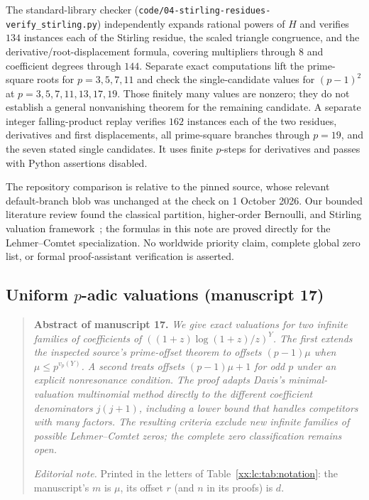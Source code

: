 \documentclass[11pt,a4paper]{article}
\numberwithin{equation}{section}
\theoremstyle{definition}
\theoremstyle{remark}
\theoremstyle{plain}
\begin{document}
The standard-library checker
(\texttt{code/04-stirling-\allowbreak residues-\allowbreak verify\_stirling.py})
independently expands rational powers of $H$ and verifies $134$ instances each
of the Stirling residue, the scaled triangle congruence, and the
derivative/root-displacement formula, covering multipliers through $8$ and
coefficient degrees through $144$. Separate exact computations lift the
prime-square roots for $p=3,5,7,11$ and check the single-candidate values for
$(p-1)^2$ at $p=3,5,7,11,13,17,19$. Those finitely many values are nonzero; they
do not establish a general nonvanishing theorem for the remaining candidate. A
separate integer falling-product replay verifies $162$ instances each of the two
residues, derivatives and first displacements, all prime-square branches through
$p=19$, and the seven stated single candidates. It uses finite $p$-steps for
derivatives and passes with Python assertions disabled.

The repository comparison is relative to the pinned source, whose relevant
default-branch blob was unchanged at the check on 1 October 2026. Our bounded
literature review found the classical partition, higher-order Bernoulli, and
Stirling valuation framework~\cite{xx-davis,xx-adelberg}; the formulas in this
note are proved directly for the Lehmer--Comtet specialization. No worldwide
priority claim, complete global zero list, or formal proof-assistant
verification is asserted.

\subsection{Uniform \texorpdfstring{$p$}{p}-adic valuations (manuscript 17)}\label{xx:pn:sec}

\begin{quote}\small
\textbf{Abstract of manuscript 17.}\itshape
We give exact valuations for two infinite families of coefficients of
$((1+z)\log(1+z)/z)^Y$. The first extends the inspected source's prime-offset
theorem to offsets $(p-1)\mu$ when $\mu\le p^{v_p(Y)}$. A second treats offsets
$(p-1)\mu+1$ for odd $p$ under an explicit nonresonance condition. The proof
adapts Davis's minimal-valuation multinomial method directly to the different
coefficient denominators $j(j+1)$, including a lower bound that handles
competitors with many factors. The resulting criteria exclude new infinite
families of possible Lehmer--Comtet zeros; the complete zero classification
remains open.
\upshape\par
\smallskip
\emph{Editorial note.}  Printed in the letters of
Table~\ref{xx:lc:tab:notation}: the manuscript's $m$ is $\mu$, its offset $r$
(and $n$ in its proofs) is $d$.
\end{quote}
\end{document}
